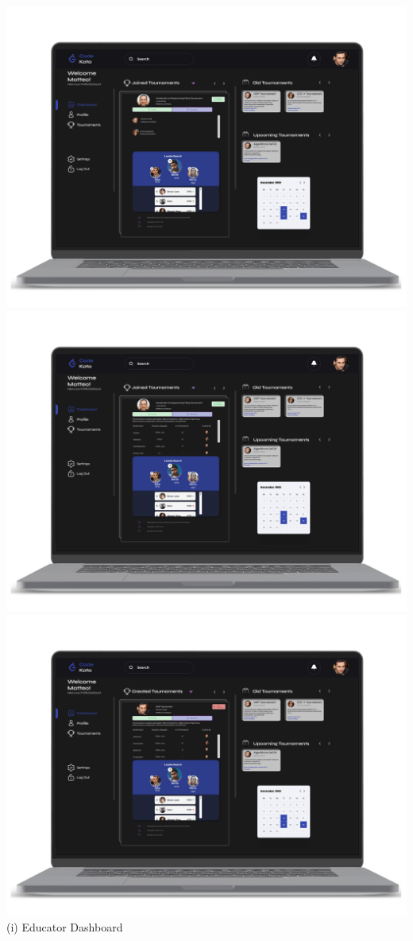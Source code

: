\begin{center}
\includegraphics[scale=0.13]{Images/ui-ux/educator_dashboard/educator_dashboard_1.png}
\includegraphics[scale=0.13]{Images/ui-ux/educator_dashboard/educator_dashboard_2.png}
\includegraphics[scale=0.13]{Images/ui-ux/educator_dashboard/educator_dashboard_3.png}
\\ (i) Educator Dashboard
\end{center}
